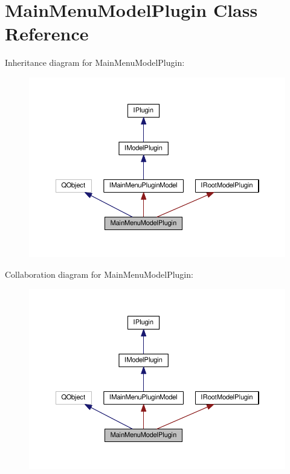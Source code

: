 \hypertarget{class_main_menu_model_plugin}{}\section{Main\+Menu\+Model\+Plugin Class Reference}
\label{class_main_menu_model_plugin}


Inheritance diagram for Main\+Menu\+Model\+Plugin\+:\nopagebreak
\begin{figure}[H]
\begin{center}
\leavevmode
\includegraphics[width=350pt]{class_main_menu_model_plugin__inherit__graph}
\end{center}
\end{figure}


Collaboration diagram for Main\+Menu\+Model\+Plugin\+:\nopagebreak
\begin{figure}[H]
\begin{center}
\leavevmode
\includegraphics[width=350pt]{class_main_menu_model_plugin__coll__graph}
\end{center}
\end{figure}
